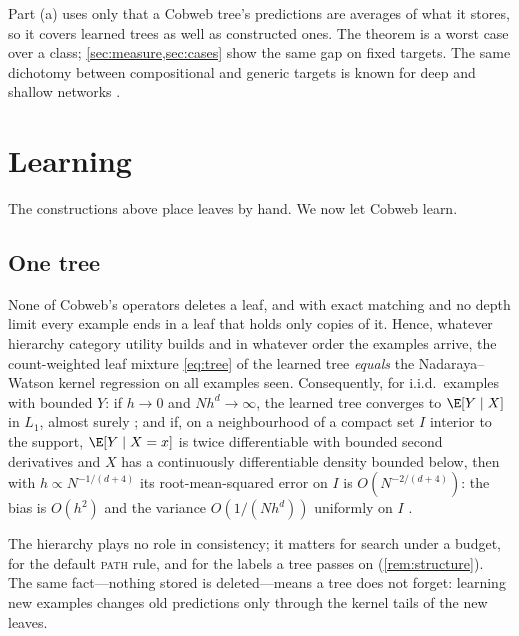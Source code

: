 Part (a) uses only that a Cobweb tree's predictions are averages of what it stores, so it
covers learned trees as well as constructed ones.  The theorem is a worst case over a class;
\cref{sec:measure,sec:cases} show the same gap on fixed targets.  The same dichotomy between compositional and generic targets is
known for deep and shallow networks \citep{poggio2017}.

\section{Learning}\label{sec:learn-main}

The constructions above place leaves by hand.  We now let Cobweb learn.

\subsection{One tree}

\begin{theorem}\label{thm:learn-tree}
None of Cobweb's operators deletes a leaf, and with exact matching and no depth limit
every example ends in a leaf that holds only copies of it.  Hence, whatever
hierarchy category utility builds and in whatever order the examples arrive, the
count-weighted leaf mixture \eqref{eq:tree} of the learned tree \emph{equals} the
Nadaraya--Watson kernel regression on all examples seen.  Consequently, for i.i.d.\ examples with bounded $Y$:
if $h\to0$ and $Nh^d\to\infty$, the learned tree converges to $\E[Y\mid X]$ in $L_1$, almost
surely \citep{devroye1989}; and if, on a neighbourhood of a compact set $I$ interior to the
support, $\E[Y\mid X=x]$ is twice differentiable with bounded second derivatives and $X$ has a
continuously differentiable density bounded below, then with $h\propto N^{-1/(d+4)}$ its
root-mean-squared error on $I$ is $O(N^{-2/(d+4)})$: the bias is $O(h^2)$ and the variance
$O(1/(Nh^d))$ uniformly on $I$ \citep{wand1995,gyorfi2002}.
\end{theorem}

The hierarchy plays no role in consistency; it matters for search under a budget, for the
default \textsc{path} rule, and for the labels a tree passes on (\cref{rem:structure}).  The
same fact---nothing stored is deleted---means a tree does not forget: learning new examples
changes old predictions only through the kernel tails of the new leaves.

